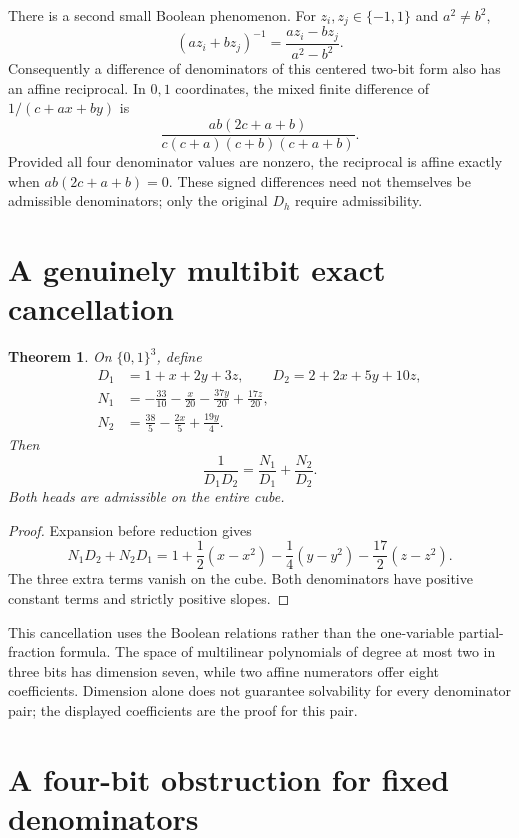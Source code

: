 \documentclass[11pt]{article}
\newtheorem{theorem}{Theorem}
\begin{document}
There is a second small Boolean phenomenon. For $z_i,z_j\in\{-1,1\}$
and $a^2\ne b^2$,
\[
 (az_i+bz_j)^{-1}=\frac{az_i-bz_j}{a^2-b^2}.
\]
Consequently a difference of denominators of this centered two-bit
form also has an affine reciprocal. In $0,1$ coordinates, the
mixed finite difference of $1/(c+ax+by)$ is
\[
 \frac{ab(2c+a+b)}{c(c+a)(c+b)(c+a+b)}.
\]
Provided all four denominator values are nonzero, the reciprocal is
affine exactly when $ab(2c+a+b)=0$. These signed differences need
not themselves be admissible denominators; only the original
$D_h$ require admissibility.

\section{A genuinely multibit exact cancellation}

\begin{theorem}
On $\{0,1\}^3$, define
\[
\begin{split}
 D_1&=1+x+2y+3z,\qquad D_2=2+2x+5y+10z,\\
 N_1&=-\frac{33}{10}-\frac{x}{20}-\frac{37y}{20}
                                      +\frac{17z}{20},\\
 N_2&=\frac{38}{5}-\frac{2x}{5}+\frac{19y}{4}.
\end{split}
\]
Then
\[
             \frac1{D_1D_2}=\frac{N_1}{D_1}+\frac{N_2}{D_2}.
\]
Both heads are admissible on the entire cube.
\end{theorem}
\begin{proof}
Expansion before reduction gives
\[
 N_1D_2+N_2D_1
 =1+\frac12(x-x^2)-\frac14(y-y^2)-\frac{17}{2}(z-z^2).
\]
The three extra terms vanish on the cube. Both denominators have
positive constant terms and strictly positive slopes.
\end{proof}

This cancellation uses the Boolean relations rather than the
one-variable partial-fraction formula. The space of multilinear
polynomials of degree at most two in three bits has dimension seven,
while two affine numerators offer eight coefficients. Dimension alone
does not guarantee solvability for every denominator pair; the
displayed coefficients are the proof for this pair.

\section{A four-bit obstruction for fixed denominators}
\end{document}
